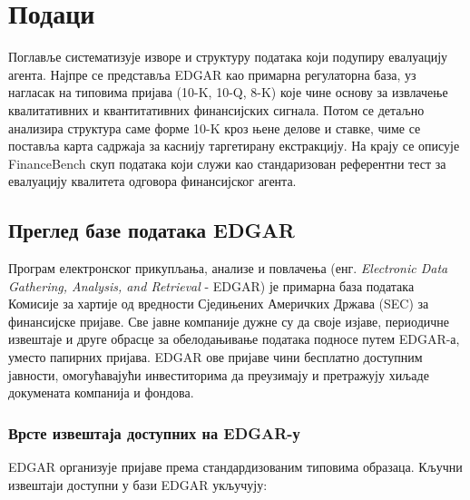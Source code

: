 \chapter{Подаци}
\label{sec:3}

Поглавље систематизује изворе и структуру података који подупиру евалуацију агента. Најпре се представља EDGAR као примарна регулаторна база, уз нагласак на типовима пријава (10-K, 10-Q, 8-K) које чине основу за извлачење квалитативних и квантитативних финансијских сигнала. Потом се детаљно анализира структура саме форме 10-K кроз њене делове и ставке, чиме се поставља карта садржаја за каснију таргетирану екстракцију. На крају се описује FinanceBench скуп података који служи као стандаризован референтни тест за евалуацију квалитета одговора финансијског агента.

\section{Преглед базе података EDGAR}
\label{secsec:3}

Програм електронског прикупљања, анализе и повлачења (енг. \textit{Electronic Data Gathering, Analysis, and Retrieval} - EDGAR) је примарна база података Комисије за хартије од вредности Сједињених Америчких Држава (SEC) за финансијске пријаве. Све јавне компаније дужне су да своје изјаве, периодичне извештаје и друге обрасце за обелодањивање података подносе путем EDGAR-а, уместо папирних пријава. EDGAR ове пријаве чини бесплатно доступним јавности, омогућавајући инвеститорима да преузимају и претражују хиљаде докумената компанија и фондова.

\subsection{Врсте извештаја доступних на EDGAR-у}

EDGAR организује пријаве према стандардизованим типовима образаца. Кључни извештаји доступни у бази EDGAR укључују:


